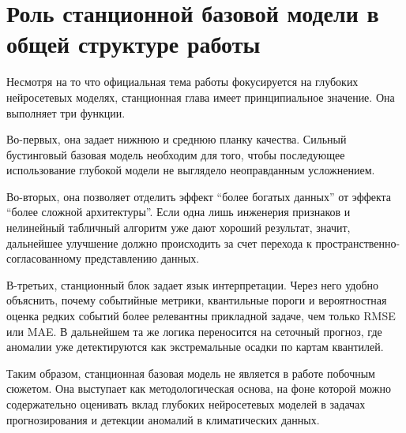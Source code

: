 \section{Роль станционной базовой модели в общей структуре работы}

Несмотря на то что официальная тема работы фокусируется на глубоких нейросетевых моделях, станционная глава имеет принципиальное значение. Она выполняет три функции.

Во-первых, она задает нижнюю и среднюю планку качества. Сильный бустинговый базовая модель необходим для того, чтобы последующее использование глубокой модели не выглядело неоправданным усложнением.

Во-вторых, она позволяет отделить эффект \enquote{более богатых данных} от эффекта \enquote{более сложной архитектуры}. Если одна лишь инженерия признаков и нелинейный табличный алгоритм уже дают хороший результат, значит, дальнейшее улучшение должно происходить за счет перехода к пространственно-согласованному представлению данных.

В-третьих, станционный блок задает язык интерпретации. Через него удобно объяснить, почему событийные метрики, квантильные пороги и вероятностная оценка редких событий более релевантны прикладной задаче, чем только RMSE или MAE. В дальнейшем та же логика переносится на сеточный прогноз, где аномалии уже детектируются как экстремальные осадки по картам квантилей.

Таким образом, станционная базовая модель не является в работе побочным сюжетом. Она выступает как методологическая основа, на фоне которой можно содержательно оценивать вклад глубоких нейросетевых моделей в задачах прогнозирования и детекции аномалий в климатических данных.
